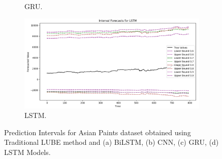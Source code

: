 \begin{figure}[H]
\begin{minipage}{0.6\textwidth}
\begin{subfigure}[b]{1.0\textwidth}
                \caption{GRU.}
            \end{subfigure}
            \begin{subfigure}[b]{1.0\textwidth}
                \centering
                \includegraphics[width=\textwidth]{Chap02/figs/LUBE_LSTM_AsianPaints.png}
                \caption{LSTM.}
            \end{subfigure}
        \end{minipage}
    
    \caption{Prediction Intervals for Asian Paints dataset obtained using Traditional LUBE method and (a) BiLSTM, (b) CNN, (c) GRU, (d) LSTM Models.}
    \label{Fi 3.3}
\end{figure}

